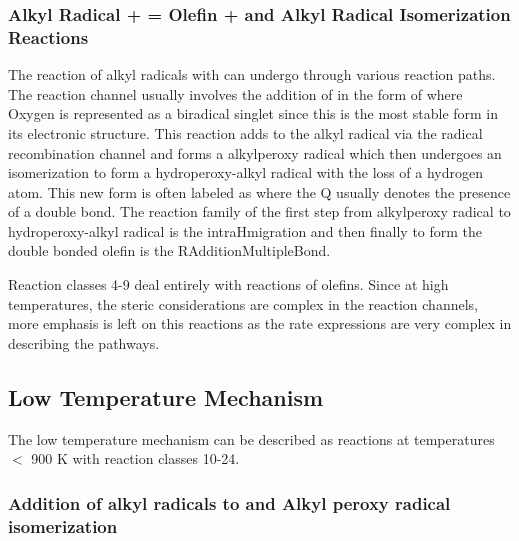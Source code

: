 \subsubsection{Alkyl Radical +  = Olefin +  and Alkyl Radical Isomerization Reactions}

The reaction of alkyl radicals with  can undergo through various reaction paths. The reaction channel usually involves the addition of  in the form of  where Oxygen is represented as a biradical singlet since this is the most stable form in its electronic structure. This reaction adds to the alkyl radical via the radical recombination channel and forms a alkylperoxy radical which then undergoes an isomerization to form a hydroperoxy-alkyl radical with the loss of a hydrogen atom. This new form is often labeled as  where the Q usually denotes the presence of a double bond. The reaction family of the first step from alkylperoxy radical to hydroperoxy-alkyl radical is the intra\textunderscore H\textunderscore migration and then finally to form the double bonded olefin is the R\textunderscore Addition\textunderscore MultipleBond.



Reaction classes 4-9 deal entirely with reactions of olefins. Since at high temperatures, the steric considerations are complex in the reaction channels, more emphasis is left on this reactions as the rate expressions are very complex in describing the pathways.

\subsection{Low Temperature Mechanism}
The low temperature mechanism can be described as reactions at temperatures $<$ 900 K with reaction classes 10-24.

\subsubsection{Addition of alkyl radicals to  and Alkyl peroxy radical isomerization }

